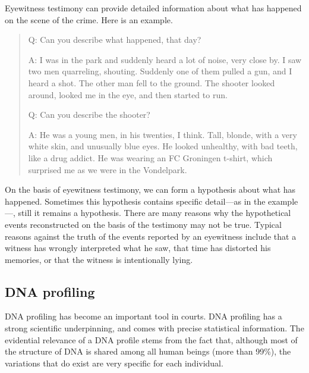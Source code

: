 \documentclass[10pt]{article}
\begin{document}
Eyewitness testimony can provide detailed information about what has happened on the scene of the crime. Here is an example.
%
\begin{quote}
Q: Can you describe what happened, that day?

A: I was in the park and suddenly heard a lot of noise, very close by. I saw two men quarreling, shouting. Suddenly one of them pulled a gun, and I heard a shot. The other man fell to the ground. The shooter looked around, looked me in the eye, and then started to run.

Q: Can you describe the shooter?

A: He was a young men, in his twenties, I think. Tall, blonde, with a very white skin, and unusually blue eyes. He looked unhealthy, with bad teeth, like a drug addict. He was wearing an FC Groningen t-shirt, which surprised me as we were in the Vondelpark.
\end{quote}
%
On the basis of eyewitness testimony, we can form a hypothesis about what has happened. Sometimes this hypothesis contains specific detail---as in the example---, still it remains a hypothesis. There are many reasons why the hypothetical events reconstructed on the basis of the testimony may not be true. Typical reasons against the truth of the events reported by an eyewitness include that a witness has wrongly interpreted what he saw, that time has distorted his memories, or that the witness is intentionally lying. 

\subsection{DNA profiling}

DNA profiling has become an important tool in courts. DNA profiling has a strong scientific underpinning, and comes with precise statistical information. The evidential relevance of a DNA profile stems from the fact that, although most of the structure of DNA is shared among all human beings (more than 99\%), the variations that do exist are very specific for each individual. 
\end{document}
